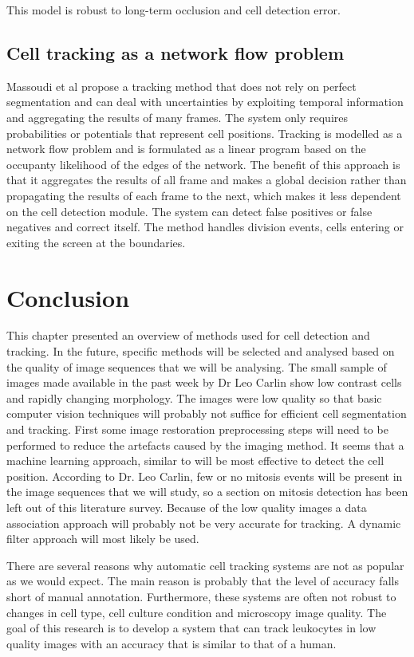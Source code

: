\documentclass[12pt,a4paper,openany]{book}
\begin{document}
This model is robust to long-term occlusion and cell detection error.

\subsection{Cell tracking as a network flow problem}

Massoudi et al \cite{massoudi12} propose a tracking method that does not rely on perfect segmentation and can deal with uncertainties by exploiting temporal information and aggregating the results of many frames. The system only requires probabilities or potentials that represent cell positions. Tracking is modelled as a network flow problem and is formulated as a linear program based on the occupanty likelihood of the edges of the network. The benefit of this approach is that it aggregates the results of all frame and makes a global decision rather than propagating the results of each frame to the next, which makes it less dependent on the cell detection module. The system can detect false positives or false negatives and correct itself. The method handles division events, cells entering or exiting the screen at the boundaries.

\section{Conclusion}
\label{sec:conclusionmethods}
This chapter presented an overview of methods used for cell detection and tracking. In the future, specific methods will be selected and analysed based on the quality of image sequences that we will be analysing. The small sample of images made available in the past week by Dr Leo Carlin show low contrast cells and rapidly changing morphology. The images were low quality so that basic computer vision techniques will probably not suffice for efficient cell segmentation and tracking. First some image restoration preprocessing steps will need to be performed to reduce the artefacts caused by the imaging method. It seems that a machine learning approach, similar to \cite{arteta13} will be most effective to detect the cell position. According to Dr. Leo Carlin, few or no mitosis events will be present in the image sequences that we will study, so a section on mitosis detection has been left out of this literature survey. Because of the low quality images a data association approach will probably not be very accurate for tracking. A dynamic filter approach will most likely be used.

There are several reasons why automatic cell tracking systems are not as popular as we would expect. The main reason is probably that the level of accuracy falls short of manual annotation. Furthermore, these systems are often not robust to changes in cell type, cell culture condition and microscopy image quality. The goal of this research is to develop a system that can track leukocytes in low quality images with an accuracy that is similar to that of a human. 
\end{document}
